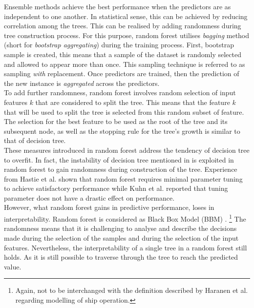 Ensemble methods achieve the best performance when the predictors are as independent to one another. In statistical sense, this can be achieved by reducing correlation among the trees. This can be realised by adding randomness during tree construction process. For this purpose, random forest utilises \emph{bagging} \citep{Breiman.1996} method (short for \emph{bootstrap aggregating}) during the training process. First, bootstrap sample is created, this means that a sample of the dataset is randomly selected and allowed to appear more than once. This sampling technique is referred to as sampling \emph{with} replacement. Once predictors are trained, then the prediction of the new instance is \emph{aggregated} across the predictors. \citep{Kuhn.2013,Hastie.2009,Geron.2019}\\

To add further randomness, random forest involves random selection of input features $k$ that are considered to split the tree. This means that the feature $k$ that will be used to split the tree is selected from this random subset of feature. The selection for the best feature to be used as the root of the tree and its subsequent node, as well as the stopping rule for the tree's growth is similar to that of decision tree. \citep{Kuhn.2013,Hastie.2009,Geron.2019}\\

These measures introduced in random forest address the tendency of decision tree to overfit. In fact, the instability of decision tree mentioned in  is exploited in random forest to gain randomness during construction of the tree. Experience from Hastie et al. \citep{Hastie.2009} shown that random forest requires minimal parameter tuning to achieve satisfactory performance while Kuhn et al. \citep{Kuhn.2013} reported that tuning parameter does not have a drastic effect on performance. \\

However, what random forest gains in predictive performance, loses in interpretability. Random forest is considered as Black Box Model (BBM) \citep{Geron.2019}. \footnote{Again, not to be interchanged with the definition described by Haranen et al. \citep{MichaelHaranen.2016} regarding modelling of ship operation.} The randomness means that it is challenging to analyse and describe the decisions made during the selection of the samples and during the selection of the input features. Nevertheless, the interpretability of a single tree in a random forest still holds. As it is still possible to traverse through the tree to reach the predicted value.\\ 

